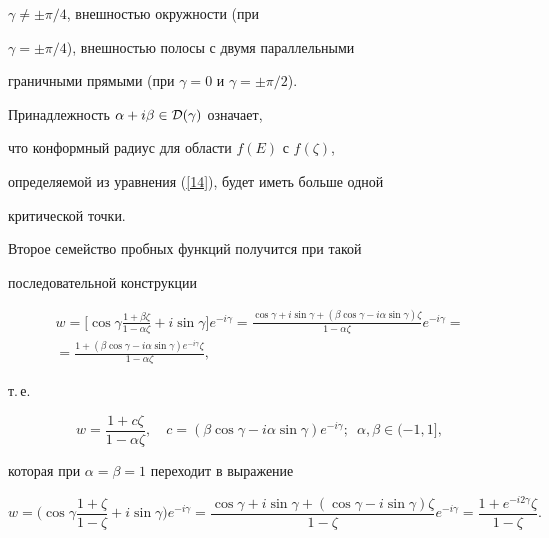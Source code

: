 $\gamma\neq\pm{\pi}/{4}$, внешностью окружности (при


$\gamma=\pm{\pi}/{4}$), внешностью полосы с двумя параллельными


граничными прямыми (при $\gamma=0$ и $\gamma=\pm{\pi}/{2}$).


Принадлежность $\alpha+i\beta\in{\cal D}(\gamma)$ означает,


что конформный радиус для области $f(E)$ с $f(\zeta)$,


определяемой из уравнения (\ref{14}), будет иметь больше одной


критической точки.





Второе семейство пробных функций получится при такой


последовательной конструкции


\begin{multline*}


w=\bigg[\cos\gamma\frac{1+\beta\zeta}


{1-\alpha\zeta}+i\sin\gamma\bigg]e^{-i\gamma} =


\frac{\cos\gamma+i\sin\gamma+


(\beta\cos\gamma-i\alpha\sin\gamma)\zeta}{1-\alpha\zeta}e^{-i\gamma}=\\


=\frac{1+(\beta\cos\gamma-i\alpha\sin\gamma)


e^{-i\gamma}\zeta}{1-\alpha\zeta},


\end{multline*}


т.\,е.


\begin{equation}\label{15}


w=\frac{1+c\zeta}{1-\alpha\zeta},\quad


c=(\beta\cos\gamma-i\alpha\sin\gamma)e^{-i\gamma};\ \;


\alpha,\beta \in(-1,1],


\end{equation}


которая при $\alpha=\beta=1$ переходит в выражение


\begin{equation}\label{16}


w=\bigg(\cos\gamma


\frac{1+\zeta}{1-\zeta}+i\sin\gamma\bigg)e^{-i\gamma}=


\frac{\cos\gamma+i\sin\gamma+(\cos\gamma-i\sin\gamma)\zeta}


{1-\zeta}e^{-i\gamma}= \frac{1+e^{-i2\gamma}\zeta}{1-\zeta}.


\end{equation}


